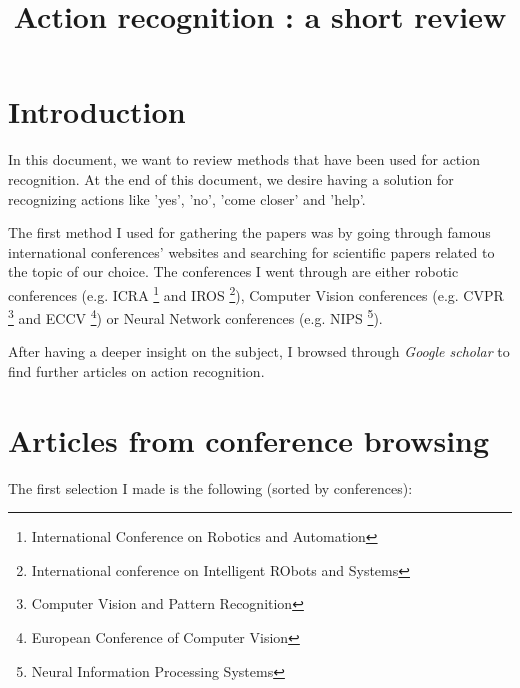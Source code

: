 \documentclass[a4paper]{article}
\begin{document}
	\title{Action recognition : a short review}


	\section{Introduction}
		In this document, we want to review methods that have been used for action recognition. At the end of this document, we desire having a solution for recognizing actions like 'yes', 'no', 'come closer' and 'help'. 

		The first method I used for gathering the papers was by going through famous international conferences' websites and searching for scientific papers related to the topic of our choice. The conferences I went through are either robotic conferences (e.g. ICRA \footnote{International Conference on Robotics and Automation} and IROS \footnote{International conference on Intelligent RObots and Systems}), Computer Vision conferences (e.g. CVPR \footnote{Computer Vision and Pattern Recognition} and ECCV \footnote{European Conference of Computer Vision}) or Neural Network conferences (e.g. NIPS \footnote{Neural Information Processing Systems}).

		After having a deeper insight on the subject, I browsed through \textit{Google scholar} to find further articles on action recognition.

	\section{Articles from conference browsing}
		The first selection I made is the following (sorted by conferences):
\end{document}
